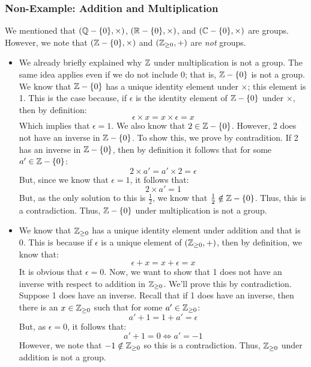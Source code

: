 \documentclass[letterpaper]{article}
\begin{document}
\subsubsection{Non-Example: Addition and Multiplication}
We mentioned that $(\mathbb{Q} - \{0\}, \times)$, $(\mathbb{R} - \{0\}, \times)$, and $(\mathbb{C} - \{0\}, \times)$ are groups. However, we note that $(\mathbb{Z} - \{0\}, \times)$ and $(\mathbb{Z}_{\geq 0}, +)$ are \emph{not} groups. 
\begin{itemize}
    \item We already briefly explained why $\mathbb{Z}$ under multiplication is not a group. The same idea applies even if we do not include 0; that is, $\mathbb{Z} - \{0\}$ is not a group. We know that $\mathbb{Z} - \{0\}$ has a unique identity element under $\times$; this element is 1. This is the case because, if $\epsilon$ is the identity element of $\mathbb{Z} - \{0\}$ under $\times$, then by definition: 
    \[\epsilon \times x = x \times \epsilon = x\]
    Which implies that $\epsilon = 1$. We also know that $2 \in \mathbb{Z} - \{0\}$. However, 2 does not have an inverse in $\mathbb{Z} - \{0\}$. To show this, we prove by contradition. If 2 has an inverse in $\mathbb{Z} - \{0\}$, then by definition it follows that for some $a' \in \mathbb{Z} - \{0\}$:
    \[2 \times a' = a' \times 2 = \epsilon\]
    But, since we know that $\epsilon = 1$, it follows that:
    \[2 \times a'= 1\]
    But, as the only solution to this is $\frac{1}{2}$, we know that $\frac{1}{2} \notin \mathbb{Z} - \{0\}$. Thus, this is a contradiction. Thus, $\mathbb{Z} - \{0\}$ under multiplication is not a group. 

    \item We know that $\mathbb{Z}_{\geq 0}$ has a unique identity element under addition and that is 0. This is because if $\epsilon$ is a unique element of $(\mathbb{Z}_{\geq 0}, +)$, then by definition, we know that: 
    \[\epsilon + x = x + \epsilon = x\]
    It is obvious that $\epsilon = 0$. Now, we want to show that 1 does not have an inverse with respect to addition in $\mathbb{Z}_{\geq 0}$. We'll prove this by contradiction. Suppose 1 does have an inverse. Recall that if 1 does have an inverse, then there is an $x \in \mathbb{Z}_{\geq 0}$ such that for some $a' \in \mathbb{Z}_{\geq 0}$:
    \[a' + 1 = 1 + a' = \epsilon\]
    But, as $\epsilon = 0$, it follows that: 
    \[a' + 1 = 0 \iff a' = -1\]
    However, we note that $-1 \notin \mathbb{Z}_{\geq 0}$ so this is a contradiction. Thus, $\mathbb{Z}_{\geq 0}$ under addition is not a group.
\end{itemize}
\end{document}
